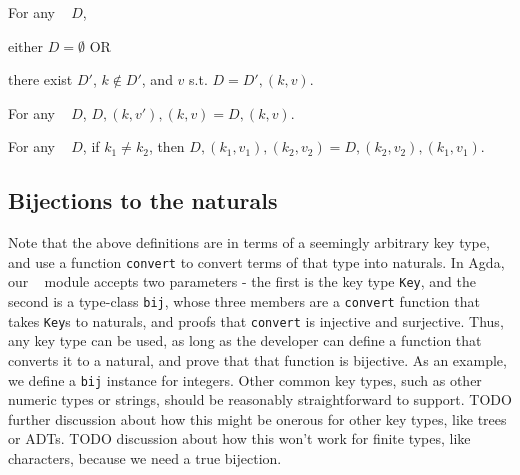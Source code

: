 \begin{theorem}[\EzDstr]
\label{thm:EzDstr}

\breakAndIndent
%
For any \dd~ $D$,

\justIndent \quad
%
either $D = \emptyset$ OR

\justIndent \quad
%
there exist $D'$, $k \notin D'$, and $v$
%
s.t. $D = D' , (k, v)$.

\end{theorem}

\begin{theorem}
\label{thm:cont-dicts}

\breakAndIndent
%
For any {\dd}~ $D$,
%
$D, (k, v'), (k, v) = D, (k, v)$.

\end{theorem}

\begin{theorem}
\label{thm:exch-dicts}

\breakAndIndent
%
For any {\dd}~ $D$,
%
if $k_1 \ne k_2$, then
%
$D, (k_1, v_1), (k_2, v_2) = D, (k_2, v_2), (k_1, v_1)$.

\end{theorem}

\subsection{Bijections to the naturals}
\label{sec:DD:bij}
Note that the above definitions are in terms of a seemingly arbitrary key type,
and use a function \texttt{convert} to convert terms of that type into naturals.
In Agda, our \dd~ module accepts two parameters - the first is the key type \texttt{Key},
and the second is a type-class \texttt{bij}, whose three members are a \texttt{convert}
function that takes \texttt{Key}s to naturals, and proofs that \texttt{convert} is
injective and surjective. Thus, any key type can be used, as long as the developer
can define a function that converts it to a natural, and prove that that function is
bijective. As an example, we define a \texttt{bij} instance for integers. Other common
key types, such as other numeric types or strings, should be reasonably straightforward
to support. TODO further discussion about how this might be onerous for other key types,
like trees or ADTs. TODO discussion about how this won't work for finite types, like
characters, because we need a true bijection.

